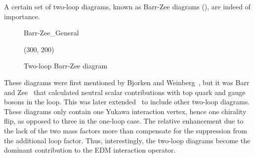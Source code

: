 A certain set of two-loop diagrams, known as Barr-Zee diagrams (), are indeed of importance.
\begin{figure}[p]
	\centering
	\begin{fmffile}{Barr-Zee_General}
		\begin{fmfgraph*}(300, 200)
			\fmffreeze
			\fmffreeze
		\end{fmfgraph*}
	\end{fmffile}
	\caption{Two-loop Barr-Zee diagram}
	\label{fig:BarrZee_general}
\end{figure}
These diagrams were first mentioned by Bjorken and Weinberg~\cite{BjorkenWeinberg1977TwoLoop},
but it was Barr and Zee~\cite{BarrZee1990TwoLoop} that calculated neutral scalar contributions with top quark and gauge bosons in the loop.
This was later extended~\cite{Leigh1991EDM,Chang1991EDM,Kao1992EDM,BowserChao1997EDM,Abe2016EDM} to include other two-loop diagrams.
These diagrams only contain one Yukawa interaction vertex, hence one chirality flip, as opposed to three in the one-loop case.
The relative enhancement due to the lack of the two mass factors more than compensate for the suppression from the additional loop factor.
Thus, interestingly, the two-loop diagrams become the dominant contribution to the EDM interaction operator.

